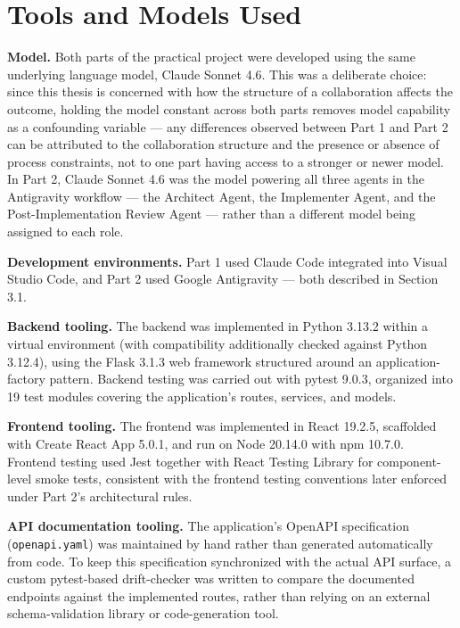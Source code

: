 \section{Tools and Models Used}

\textbf{Model.} Both parts of the practical project were developed using the same underlying language model, Claude Sonnet 4.6. This was a deliberate choice: since this thesis is concerned with how the structure of a collaboration affects the outcome, holding the model constant across both parts removes model capability as a confounding variable --- any differences observed between Part 1 and Part 2 can be attributed to the collaboration structure and the presence or absence of process constraints, not to one part having access to a stronger or newer model. In Part 2, Claude Sonnet 4.6 was the model powering all three agents in the Antigravity workflow --- the Architect Agent, the Implementer Agent, and the Post-Implementation Review Agent --- rather than a different model being assigned to each role.

\textbf{Development environments.} Part 1 used Claude Code integrated into Visual Studio Code, and Part 2 used Google Antigravity --- both described in Section 3.1.

\textbf{Backend tooling.} The backend was implemented in Python 3.13.2 within a virtual environment (with compatibility additionally checked against Python 3.12.4), using the Flask 3.1.3 web framework structured around an application-factory pattern. Backend testing was carried out with pytest 9.0.3, organized into 19 test modules covering the application's routes, services, and models.

\textbf{Frontend tooling.} The frontend was implemented in React 19.2.5, scaffolded with Create React App 5.0.1, and run on Node 20.14.0 with npm 10.7.0. Frontend testing used Jest together with React Testing Library for component-level smoke tests, consistent with the frontend testing conventions later enforced under Part 2's architectural rules.

\textbf{API documentation tooling.} The application's OpenAPI specification (\texttt{openapi.yaml}) was maintained by hand rather than generated automatically from code. To keep this specification synchronized with the actual API surface, a custom pytest-based drift-checker was written to compare the documented endpoints against the implemented routes, rather than relying on an external schema-validation library or code-generation tool.


